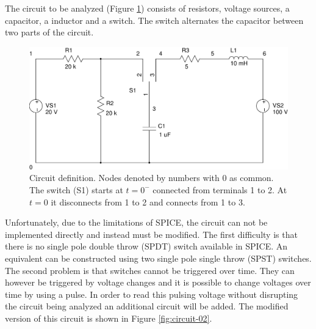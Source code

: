 \documentclass{article}
\begin{document}
The circuit to be analyzed (Figure \ref{fig:circuit}) consists of
resistors, voltage sources, a capacitor, a inductor and a switch.
The switch alternates the capacitor between two parts of the circuit.

\begin{figure}
\center
\includegraphics[scale=0.5]{spice/circuit-01}
\caption{Circuit definition.
Nodes denoted by numbers with 0 as common.
The switch (S1) starts at $t=0^-$ connected from terminals 1 to 2.
At $t=0$ it disconnects from 1 to 2 and connects from 1 to 3.
}
\label{fig:circuit}
\end{figure}

Unfortunately, due to the limitations of SPICE, the circuit can not be
implemented directly and instead must be modified.
The first difficulty is that there is no single pole double throw (SPDT) switch
available in SPICE.
An equivalent can be constructed using two single pole single throw (SPST)
switches.
The second problem is that switches cannot be triggered over time.
They can however be triggered by voltage changes and it is possible
to change voltages over time by using a pulse.
In order to read this pulsing voltage without disrupting the circuit being
analyzed an additional circuit will be added.
The modified version of this circuit is shown in Figure \ref{fig:circuit-02}.
\end{document}
